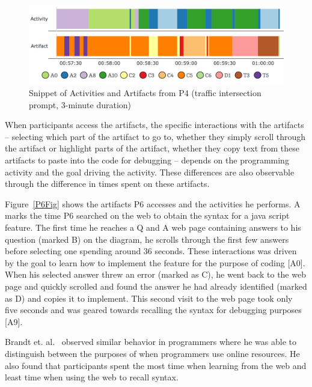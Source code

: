 \begin{figure}
\includegraphics[width=\columnwidth]{figures/P4timeplot}
\caption{Snippet of Activities and Artifacts from P4 (traffic intersection prompt, 3-minute duration)}
\label{P4Fig}
\end{figure}

When participants access the artifacts, the specific interactions with the artifacts -- selecting which part of the artifact to go to, whether they simply scroll through the artifact or highlight parts of the artifact, whether they copy text from these artifacts to paste into the code for debugging -- depends on the programming activity and the goal driving the activity. These differences are also observable through the difference in times spent on these artifacts.

Figure~\ref{P6Fig} shows the artifacts P6 accesses and the activities he performs. A marks the time P6 searched on the web to obtain the syntax for a java script feature. The first time he reaches a Q and A web page containing answers to his question (marked B) on the diagram, he scrolls through the first few answers before selecting one spending around 36 seconds. These interactions was driven by the goal to learn how to implement the feature for the purpose of coding [A0]. When his selected answer threw an error (marked as C), he went back to the web page and quickly scrolled and found the answer he had already identified (marked as D) and copies it to implement. This second visit to the web page took only five seconds and was geared towards recalling the syntax for debugging purposes [A9]. 

Brandt et. al.~\cite{Brandt:2009} observed similar behavior in programmers where he was able to distinguish between the purposes of when programmers use online resources. He also found that participants spent the most time when learning from the web and least time when using the web to recall syntax.


